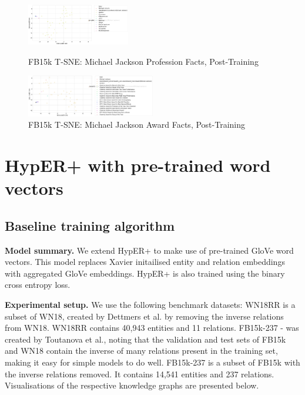 \begin{figure}[H]
	\parbox{.5\linewidth}{
   		\centering
    		\includegraphics[width=0.4\textwidth, height=0.2\textheight]{t_sne_test_profession}
		\captionsetup{justification=centering}
		\caption{FB15k T-SNE: Michael Jackson Profession Facts, Post-Training}
		}
	\hfill
	\parbox{.5\linewidth}{
   		\centering
		\includegraphics[width=0.5\textwidth, height=0.2\textheight]{t_sne_test_award}
		\captionsetup{justification=centering}
		\caption{FB15k T-SNE: Michael Jackson Award Facts, Post-Training}
		}
\end{figure}

\newpage



\section{HypER+ with pre-trained word vectors}

\subsection{Baseline training algorithm}
\textbf{Model summary.} We extend HypER+ to make use of pre-trained GloVe word vectors. This model replaces Xavier initailised entity and relation embeddings with aggregated GloVe embeddings. 
HypER+ is also trained using the binary cross entropy loss. \par

\noindent \textbf{Experimental setup.} We use the following benchmark datasets: WN18RR is a subset of WN18, created by Dettmers et al. by removing the inverse relations from WN18. WN18RR contains 40,943 entities and 11 relations. FB15k-237 - was created by Toutanova et al., noting that the validation and test sets of FB15k and WN18 contain the inverse of many relations present in the training set, making it easy for simple models to do well. FB15k-237 is a subset of FB15k with the inverse relations removed. It contains 14,541 entities and 237 relations. Visualisations of the respective knowledge graphs are presented below. 

